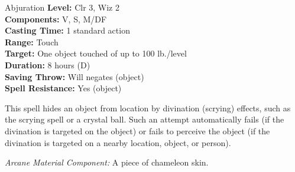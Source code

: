 {Abjuration}
{
	\textbf{Level:}
	Clr 3, Wiz 2\\
	\textbf{Components:}
	V, S, M/DF\\
	\textbf{Casting Time:}
	1 standard action\\
	\textbf{Range:}
	Touch\\
	\textbf{Target:}
	One object touched of up to 100 lb./level\\
	\textbf{Duration:}
	8 hours (D)\\
	\textbf{Saving Throw:}
	Will negates (object)\\
	\textbf{Spell Resistance:}
	Yes (object)\\
}
{
	This spell hides an object from location by divination (scrying) effects, such as the scrying spell or a crystal ball. Such an attempt automatically fails (if the divination is targeted on the object) or fails to perceive the object (if the divination is targeted on a nearby location, object, or person).

	\textit{Arcane Material Component:}
	A piece of chameleon skin.

}
